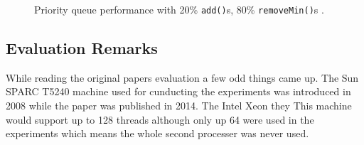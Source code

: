 \begin{figure}[htb]
\begin{minipage}[b]{.495\textwidth}
		\caption{Priority queue performance with 20\% \texttt{add()}s, 80\% \texttt{removeMin()}s \cite{braginsky_cbpq:_2016}.}
		\label{fig:cbpq_20}
	\end{minipage}
\end{figure}

\subsection{Evaluation Remarks}
While reading the original papers evaluation a few odd things came up. The Sun SPARC T5240 machine used for cunducting the experiments was introduced in 2008 while the paper was published in 2014. The Intel Xeon they This machine would support up to 128 threads although only up 64 were used in the experiments which means the whole second processer was never used.





